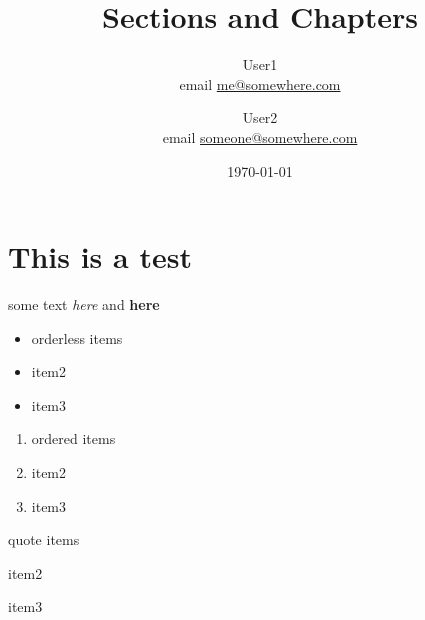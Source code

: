 \documentclass{article}
\title{Sections and Chapters}
\author{
     User1 \\ email \href{mailto:me@somewhere.com}{me@somewhere.com}
\and User2 \\ email \href{mailto:someone@somewhere.com}{someone@somewhere.com}
}
\date{\today}
\begin{document}
\section{This is a test}
\label{sec:this-is-a-test}

some text \emph{here} and \textbf{here}

\begin{itemize}
    \item orderless items
    \item item2
    \item item3
\end{itemize}

\begin{enumerate}
    \item ordered items
    \item item2
    \item item3
\end{enumerate}

\begin{displayquote}
quote items

item2

item3
\end{displayquote}
\end{document}
